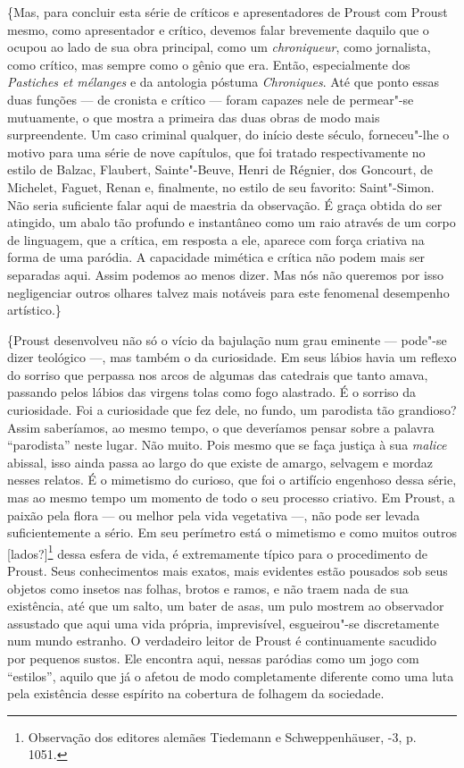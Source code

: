 \{Mas, para concluir esta série de críticos e apresentadores de Proust
com Proust mesmo, como apresentador e crítico, devemos falar brevemente
daquilo que o ocupou ao lado de sua obra principal, como um
\emph{chroniqueur}, como jornalista, como crítico, mas sempre como o
gênio que era. Então, especialmente dos \emph{Pastiches et mélanges} e
da antologia póstuma \emph{Chroniques}. Até que ponto essas duas
funções --- de cronista e crítico --- foram capazes nele de permear"-se
mutuamente, o que mostra a primeira das duas obras de modo mais
surpreendente. Um caso criminal qualquer, do início deste século,
forneceu"-lhe o motivo para uma série de nove capítulos, que foi
tratado respectivamente no estilo de Balzac, Flaubert, Sainte"-Beuve,
Henri de Régnier, dos Goncourt, de Michelet, Faguet, Renan e,
finalmente, no estilo de seu favorito: Saint"-Simon. Não seria suficiente
falar aqui de maestria da observação. É graça obtida do ser atingido, um
abalo tão profundo e instantâneo como um raio através de um corpo
de linguagem, que a crítica, em resposta a ele, aparece com força
criativa na forma de uma paródia. A capacidade mimética e crítica não
podem mais ser separadas aqui. Assim podemos ao menos dizer. Mas nós não
queremos por isso negligenciar outros olhares talvez mais notáveis para
este fenomenal desempenho artístico.\}

\{Proust desenvolveu não só o vício da bajulação num grau eminente ---
pode"-se dizer teológico ---, mas também o da curiosidade. Em seus lábios
havia um reflexo do sorriso que perpassa nos arcos de algumas das
catedrais que tanto amava, passando pelos lábios das virgens tolas como
fogo alastrado. É o sorriso da curiosidade. Foi a curiosidade que fez dele, no
fundo, um parodista tão grandioso? Assim saberíamos, ao mesmo
tempo, o que deveríamos pensar sobre a palavra ``parodista'' neste lugar.
Não muito. Pois mesmo que se faça justiça à sua \emph{malice} abissal,
isso ainda passa ao largo do que existe de amargo, selvagem e mordaz nesses relatos. É
o mimetismo do curioso, que foi o artifício engenhoso dessa série, mas ao mesmo tempo um momento de todo o seu processo
criativo. Em Proust, a paixão pela flora --- ou melhor pela vida vegetativa ---,
não pode ser levada suficientemente a sério. Em seu perímetro está o
mimetismo e como muitos outros {[}lados?{]}\footnote{Observação dos
  editores alemães Tiedemann e Schweppenhäuser, -3,
  p. 1051. \versal{[N.~O.]}} dessa esfera de vida, é extremamente típico para o
procedimento de Proust. Seus conhecimentos mais exatos, mais evidentes
estão pousados sob seus objetos como insetos nas folhas, brotos e
ramos, e não traem nada de sua existência, até que um salto, um bater
de asas, um pulo mostrem ao observador assustado que aqui uma vida própria,
imprevisível, esgueirou"-se discretamente num mundo
estranho. O verdadeiro leitor de Proust é continuamente sacudido por
pequenos sustos. Ele encontra aqui, nessas paródias como um jogo com
``estilos'', aquilo que já o afetou de modo completamente diferente como
uma luta pela existência desse espírito na cobertura de folhagem da
sociedade.

